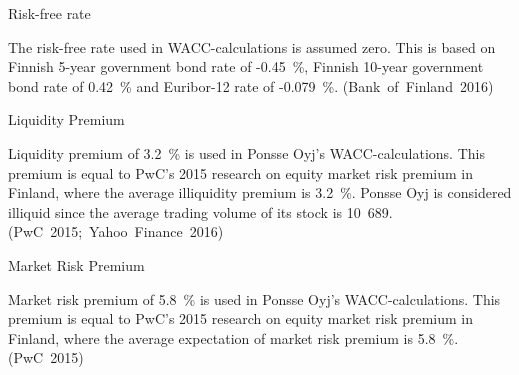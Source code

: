Risk-free rate

The risk-free rate used in WACC-calculations is assumed zero. This is based on Finnish 5-year government bond rate of -0.45~\%, Finnish 10-year government bond rate of 0.42~\% and Euribor-12 rate of -0.079~\%. (Bank~of~Finland~2016)

Liquidity Premium

Liquidity premium of 3.2~\% is used in Ponsse Oyj’s WACC-calculations. This premium is equal to PwC’s 2015 research on equity market risk premium in Finland, where the average illiquidity premium is 3.2~\%. Ponsse Oyj is considered illiquid since the average trading volume of its stock is 10~689. (PwC~2015;~Yahoo~Finance~2016)

Market Risk Premium 

Market risk premium of 5.8~\% is used in Ponsse Oyj’s WACC-calculations. This premium is equal to PwC’s 2015 research on equity market risk premium in Finland, where the average expectation of market risk premium is 5.8~\%. (PwC~2015)


